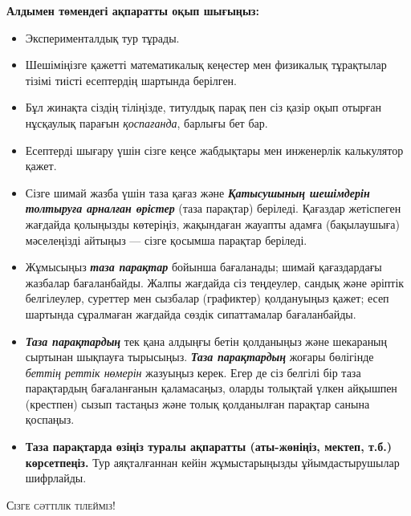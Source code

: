 \thispagestyle{empty}
\begin{center}
    \LARGE\textbf{\scshape{}}%
\end{center}
%
\vspace{2pt}%
%
\begin{center}
    \large{}
\end{center}
\vspace{2pt}
\begin{center}
\large\textbf{%
Алдымен төмендегі ақпаратты оқып шығыңыз:%
}
\end{center}
\vspace{4pt}
\begin{itemize}[leftmargin=*]
    \item Эксперименталдық тур  тұрады.
    \item Шешіміңізге қажетті математикалық кеңестер мен физикалық тұрақтылар тізімі тиісті есептердің шартында берілген.
    \item Бұл жинақта сіздің тіліңізде, титулдық парақ пен сіз қазір оқып отырған нұсқаулық парағын \textit{қоспағанда}, барлығы \pageref{LastPage} бет бар.
    \item Есептерді шығару үшін сізге кеңсе жабдықтары мен инженерлік калькулятор қажет.
    \item Сізге шимай жазба үшін таза қағаз және \textbf{\textit{Қатысушының шешімдерін толтыруға арналған өрістер}} (таза парақтар) беріледі. Қағаздар жетіспеген жағдайда қолыңызды көтеріңіз, жақындаған жауапты адамға (бақылаушыға) мәселеңізді айтыңыз --- сізге қосымша парақтар беріледі.
    \item Жұмысыңыз \textbf{\textit{таза парақтар}} бойынша бағаланады; шимай қағаздардағы жазбалар бағаланбайды. Жалпы жағдайда сіз теңдеулер, сандық және әріптік белгілеулер, суреттер мен сызбалар (графиктер) қолдануыңыз қажет; есеп шартында сұралмаған жағдайда сөздік сипаттамалар бағаланбайды.
    \item \textbf{\textit{Таза парақтардың}} тек қана алдыңғы бетін қолданыңыз және шекараның сыртынан шықпауға тырысыңыз. \textbf{\textit{Таза парақтардың}} жоғары бөлігінде \textit{беттің реттік нөмерін} жазуыңыз керек. Егер де сіз белгілі бір таза парақтардың бағаланғанын қаламасаңыз, оларды толықтай үлкен айқышпен (крестпен) сызып тастаңыз және толық қолданылған парақтар санына қоспаңыз.
    \item \textbf{Таза парақтарда өзіңіз туралы ақпаратты (аты-жөніңіз, мектеп, т.б.) көрсетпеңіз.} Тур аяқталғаннан кейін жұмыстарыңызды ұйымдастырушылар шифрлайды.
\end{itemize}
\vspace{4pt}
\begin{center}
    \textsc{Сізге сәттілік тілейміз!}
\end{center}
%
\begin{center}
    \textit{}
\end{center}

\newpage